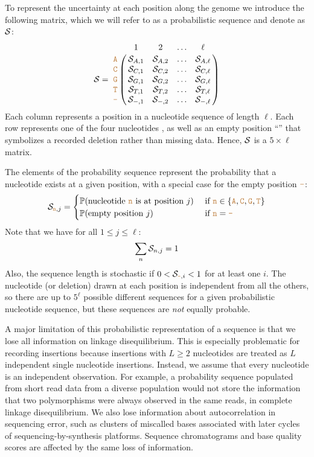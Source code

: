 \documentclass[12pt]{article}
\begin{document}
To represent the uncertainty at each position along the genome we introduce the following matrix, which we will refer to as a probabilistic sequence and denote as $\mathcal{S}$:
\begin{equation}
\nps = \bordermatrix{   & 1 & 2 & \ldots & \ell \cr
                \sq{A} & \nps_{A, 1} & \nps_{A, 2} & \ldots & \nps_{A, \ell} \cr
                \sq{C} & \nps_{C, 1} & \nps_{C, 2} & \ldots & \nps_{C, \ell} \cr
                \sq{G} & \nps_{G, 1} & \nps_{G, 2} & \ldots & \nps_{G, \ell} \cr
                \sq{T} & \nps_{T, 1} & \nps_{T, 2} & \ldots & \nps_{T, \ell} \cr 
                \sq{-} & \nps_{-, 1} & \nps_{-, 2} & \ldots & \nps_{-, \ell} \cr 
}\label{eq:nps}
\end{equation}
Each column represents a position in a nucleotide sequence of length $\ell$.
Each row represents one of the four nucleotides , as well as an empty position ``\sq{-}'' that symbolizes a recorded deletion rather than missing data.
Hence, $\mathcal{S}$ is a $5\times\ell$ matrix.



The elements of the probability sequence represent the probability that a nucleotide exists at a given position, with a special case for the empty position $\texttt{\textcolor{brown}{-}}$:
\begin{equation}
\mathcal{S}_{\texttt{\textcolor{brown}{n}},j} = \begin{cases}
\mathbb{P}(\text{nucleotide \texttt{\textcolor{brown}{n}} is at position }j) & \text{ if }\texttt{\textcolor{brown}{n}}\in\{\texttt{\textcolor{brown}{A}}, \texttt{\textcolor{brown}{C}}, \texttt{\textcolor{brown}{G}}, \texttt{\textcolor{brown}{T}}\}\\
\mathbb{P}(\text{empty position }j) & \text{ if }\texttt{\textcolor{brown}{n}} = \texttt{\textcolor{brown}{-}}
\end{cases}
\end{equation}
Note that we have for all $1\leq j \leq \ell$:
\begin{equation}
\sum_{n} \mathcal{S}_{n, j} = 1
\end{equation}
Also, the sequence length is stochastic if $0<\mathcal{S}_{\texttt{\textcolor{brown}{-}},i}<1$ for at least one $i$.
The nucleotide (or deletion) drawn at each position is independent from all the others, so there are up to $5^\ell$ possible different sequences for a given probabilistic nucleotide sequence, but these sequences are \emph{not} equally probable.

A major limitation of this probabilistic representation of a sequence is that we lose all information on linkage disequilibrium.
This is especially problematic for recording insertions because insertions with $L \ge 2$ nucleotides are treated as $L$ independent single nucleotide insertions.
Instead, we assume that every nucleotide is an independent observation.
For example, a probability sequence populated from short read data from a diverse population would not store the information that two polymorphisms were always observed in the same reads, \ie in complete linkage disequilibrium.
We also lose information about autocorrelation in sequencing error, such as clusters of miscalled bases associated with later cycles of sequencing-by-synthesis platforms.
Sequence chromatograms and base quality scores are affected by the same loss of information.
\end{document}
